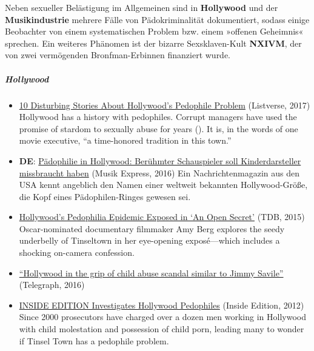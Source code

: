 Neben sexueller Belästigung im Allgemeinen sind in \textbf{Hollywood}
und der \textbf{Musikindustrie} mehrere Fälle von Pädokriminalität
dokumentiert, sodass einige Beobachter von einem systematischen Problem
bzw. einem »offenen Geheimnis« sprechen. Ein weiteres Phänomen ist der
bizarre Sexsklaven-Kult \textbf{NXIVM}, der von zwei vermögenden
Bronfman-Erbinnen finanziert wurde.

\hypertarget{hollywood}{%
\subparagraph{\texorpdfstring{\textbf{Hollywood}}{Hollywood}}\label{hollywood}}

\begin{itemize}
\tightlist
\item
  \href{https://listverse.com/2017/02/26/10-disturbing-stories-about-hollywoods-pedophile-problem/}{10
  Disturbing Stories About Hollywood's Pedophile Problem} (Listverse,
  2017) Hollywood has a history with pedophiles. Corrupt managers have
  used the promise of stardom to sexually abuse for years (). It is, in
  the words of one movie executive, ``a time-honored tradition in this
  town.''
\item
  \textbf{DE}:
  \href{https://www.musikexpress.de/paedophilie-in-hollywood-beruehmter-schauspieler-soll-kinderdarsteller-missbraucht-haben-670941/}{Pädophilie
  in Hollywood: Berühmter Schauspieler soll Kinderdarsteller missbraucht
  haben} (Musik Express, 2016) Ein Nachrichtenmagazin aus den USA kennt
  angeblich den Namen einer weltweit bekannten Hollywood-Größe, die Kopf
  eines Pädophilen-Ringes gewesen sei.
\item
  \href{https://www.thedailybeast.com/hollywoods-pedophilia-epidemic-exposed-in-an-open-secret}{Hollywood's
  Pedophilia Epidemic Exposed in `An Open Secret'} (TDB, 2015)
  Oscar-nominated documentary filmmaker Amy Berg explores the seedy
  underbelly of Tinseltown in her eye-opening exposé---which includes a
  shocking on-camera confession.
\item
  \href{https://www.telegraph.co.uk/news/2016/05/22/hollywood-in-the-grip-of-child-abuse-scandal-similar-to-jimmy-sa/}{``Hollywood
  in the grip of child abuse scandal similar to Jimmy Savile''}
  (Telegraph, 2016)
\item
  \href{https://www.insideedition.com/investigative/5086-inside-edition-investigates-hollywood-pedophiles}{INSIDE
  EDITION Investigates Hollywood Pedophiles} (Inside Edition, 2012)
  Since 2000 prosecutors have charged over a dozen men working in
  Hollywood with child molestation and possession of child porn, leading
  many to wonder if Tinsel Town has a pedophile problem.

\end{itemize}
